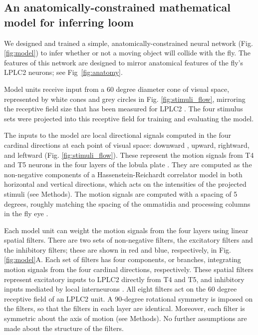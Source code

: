 \documentclass[pdftex,9pt,lineno]{elife}
\begin{document}

\subsection{An anatomically-constrained mathematical model for inferring loom}

We designed and trained a simple, anatomically-constrained neural network (Fig. \ref{fig:model}) to infer whether or not a moving object will collide with the fly. The features of this network are designed to mirror anatomical features of the fly's LPLC2 neurons; see Fig~\ref{fig:anatomy}.

Model units receive input from a 60 degree diameter cone of visual space, represented by white cones and grey circles in Fig. \ref{fig:stimuli_flow}, mirroring the receptive field size that has been measured for LPLC2 \citep{klapoetke2017ultra}. The four stimulus sets were projected into this receptive field for training and evaluating the model.

The inputs to the model are local directional signals computed in the four cardinal directions at each point of visual space: downward , upward, rightward, and leftward (Fig. \ref{fig:stimuli_flow}). These represent the motion signals from T4 and T5 neurons in the four layers of the lobula plate \citep{maisak2013directional}. They are computed as the non-negative components of a Hassenstein-Reichardt correlator model \citep{hassenstein1956systemtheoretische} in both horizontal and vertical directions, which acts on the intensities of the projected stimuli (see Methods). The motion signals are computed with a spacing of 5 degrees, roughly matching the spacing of the ommatidia and processing columns in the fly eye \citep{stavenga2003angular}. %

Each model unit can weight the motion signals from the four layers using linear spatial filters. There are two sets of non-negative filters, the excitatory filters and the inhibitory filters; these are shown in red and blue, respectively, in Fig. \ref{fig:model}A. Each set of filters has four components, or branches, integrating motion signals from the four cardinal directions, respectively. These spatial filters represent excitatory inputs to LPLC2 directly from T4 and T5, and inhibitory inputs  mediated by local interneurons \citep{klapoetke2017ultra,mauss2015neural}. All eight filters act on the 60 degree receptive field of an LPLC2 unit. A 90-degree rotational symmetry is imposed on the filters, so that the filters in each layer are identical. Moreover, each filter is symmetric about the axis of motion (see Methods). No further assumptions are made about the structure of the filters.
\end{document}
